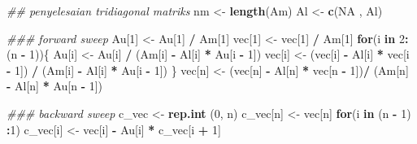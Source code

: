 \documentclass[]{book}
\newenvironment{Shaded}{\begin{snugshade}}{\end{snugshade}}
\newcommand{\CommentTok}[1]{\textcolor[rgb]{0.56,0.35,0.01}{\textit{#1}}}
\newcommand{\ControlFlowTok}[1]{\textcolor[rgb]{0.13,0.29,0.53}{\textbf{#1}}}
\newcommand{\DecValTok}[1]{\textcolor[rgb]{0.00,0.00,0.81}{#1}}
\newcommand{\KeywordTok}[1]{\textcolor[rgb]{0.13,0.29,0.53}{\textbf{#1}}}
\newcommand{\NormalTok}[1]{#1}
\newcommand{\OperatorTok}[1]{\textcolor[rgb]{0.81,0.36,0.00}{\textbf{#1}}}
\newcommand{\OtherTok}[1]{\textcolor[rgb]{0.56,0.35,0.01}{#1}}
\newcommand{\StringTok}[1]{\textcolor[rgb]{0.31,0.60,0.02}{#1}}
\theoremstyle{definition}
\theoremstyle{definition}
\theoremstyle{definition}
\theoremstyle{remark}
\begin{document}
\begin{Shaded}
\begin{Highlighting}[]
  \CommentTok{## penyelesaian tridiagonal matriks}
\NormalTok{  nm <-}\StringTok{ }\KeywordTok{length}\NormalTok{(Am)}
\NormalTok{  Al <-}\StringTok{ }\KeywordTok{c}\NormalTok{(}\OtherTok{NA}\NormalTok{ , Al)}
  
  \CommentTok{### forward sweep}
\NormalTok{  Au[}\DecValTok{1}\NormalTok{] <-}\StringTok{ }\NormalTok{Au[}\DecValTok{1}\NormalTok{] }\OperatorTok{/}\StringTok{ }\NormalTok{Am[}\DecValTok{1}\NormalTok{]}
\NormalTok{  vec[}\DecValTok{1}\NormalTok{] <-}\StringTok{ }\NormalTok{vec[}\DecValTok{1}\NormalTok{] }\OperatorTok{/}\StringTok{ }\NormalTok{Am[}\DecValTok{1}\NormalTok{]}
  \ControlFlowTok{for}\NormalTok{(i }\ControlFlowTok{in} \DecValTok{2}\OperatorTok{:}\NormalTok{(n }\OperatorTok{-}\StringTok{ }\DecValTok{1}\NormalTok{))\{}
\NormalTok{      Au[i] <-}\StringTok{ }\NormalTok{Au[i] }\OperatorTok{/}\StringTok{ }\NormalTok{(Am[i] }\OperatorTok{-}\StringTok{ }\NormalTok{Al[i] }\OperatorTok{*}\StringTok{ }\NormalTok{Au[i }\OperatorTok{-}\StringTok{ }\DecValTok{1}\NormalTok{])}
\NormalTok{      vec[i] <-}\StringTok{ }\NormalTok{(vec[i] }\OperatorTok{-}\StringTok{ }\NormalTok{Al[i] }\OperatorTok{*}\StringTok{ }\NormalTok{vec[i }\OperatorTok{-}\StringTok{ }\DecValTok{1}\NormalTok{]) }\OperatorTok{/}
\StringTok{                }\NormalTok{(Am[i] }\OperatorTok{-}\StringTok{ }\NormalTok{Al[i] }\OperatorTok{*}\StringTok{ }\NormalTok{Au[i }\OperatorTok{-}\StringTok{ }\DecValTok{1}\NormalTok{])}
\NormalTok{  \}}
\NormalTok{  vec[n] <-}\StringTok{ }\NormalTok{(vec[n] }\OperatorTok{-}\StringTok{ }\NormalTok{Al[n] }\OperatorTok{*}\StringTok{ }\NormalTok{vec[n }\OperatorTok{-}\StringTok{ }\DecValTok{1}\NormalTok{])}\OperatorTok{/}
\StringTok{            }\NormalTok{(Am[n] }\OperatorTok{-}\StringTok{ }\NormalTok{Al[n] }\OperatorTok{*}\StringTok{ }\NormalTok{Au[n }\OperatorTok{-}\StringTok{ }\DecValTok{1}\NormalTok{])}
  
  \CommentTok{### backward sweep}
\NormalTok{  c_vec <-}\StringTok{ }\KeywordTok{rep.int}\NormalTok{ (}\DecValTok{0}\NormalTok{, n)}
\NormalTok{  c_vec[n] <-}\StringTok{ }\NormalTok{vec[n]}
  \ControlFlowTok{for}\NormalTok{(i }\ControlFlowTok{in}\NormalTok{ (n }\OperatorTok{-}\StringTok{ }\DecValTok{1}\NormalTok{) }\OperatorTok{:}\DecValTok{1}\NormalTok{)}
\NormalTok{      c_vec[i] <-}\StringTok{ }\NormalTok{vec[i] }\OperatorTok{-}\StringTok{ }\NormalTok{Au[i] }\OperatorTok{*}\StringTok{ }\NormalTok{c_vec[i }\OperatorTok{+}\StringTok{ }\DecValTok{1}\NormalTok{]}
  

\end{Highlighting}
\end{Shaded}
\end{document}
